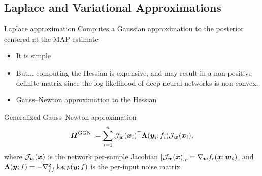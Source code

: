 \documentclass[9pt,handout]{beamer}
\begin{document}
\subsection{Laplace and Variational Approximations}

\begin{frame}{Laplace approximation}
Computes a Gaussian approximation to the posterior centered at the MAP estimate

\begin{itemize}
	\item It is simple
	\item But... computing the Hessian is expensive, and may result in a non-positive definite matrix since the log likelihood of deep neural networks is non-convex.
	\item Gauss--Newton approximation to the Hessian
\end{itemize}

\begin{block}{Generalized Gauss--Newton approximation}
	$$\boldsymbol{H}^{\mathrm{GGN}}:= \sum_{i=1}^n \mathcal{J}_{\boldsymbol{w}}(\boldsymbol{x}_i)^{\top}\boldsymbol{\Lambda}(\boldsymbol{y}_i;f_i)\mathcal{J}_{\boldsymbol{w}}(\boldsymbol{x}_i),$$
where $\mathcal{J}_{\boldsymbol{w}}(\boldsymbol{x})$ is the network per-sample Jacobian $\left[\mathcal{J}_{\boldsymbol{w}}(\boldsymbol{x})\right]_{c}=\nabla_{\boldsymbol{w}}f_c(\boldsymbol{x};\boldsymbol{w}_{\hat{\rho}})$, and $\boldsymbol{\Lambda}(\boldsymbol{y};f)=-\nabla^2_{ff}\log p(\boldsymbol{y};f)$ is the per-input noise matrix.%
\end{block}

\end{frame}
\end{document}
